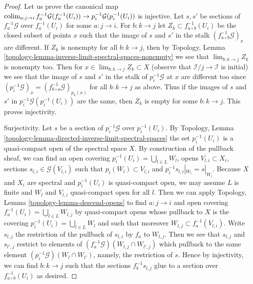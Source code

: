 \begin{proof}
Let us prove the canonical map
$\mathop{\mathrm{colim}}\nolimits_{a : j \to i} f_a^{-1}\mathcal{G}(f_a^{-1}(U_i)) \to
p_i^{-1}\mathcal{G}(p_i^{-1}(U_i))$ is injective.
Let $s, s'$ be sections of $f_a^{-1}\mathcal{G}$
over $f_a^{-1}(U_i)$ for some $a : j \to i$. For
$b : k \to j$ let $Z_k \subset f_{a \circ b}^{-1}(U_i)$
be the closed subset of points $x$ such that the image of
$s$ and $s'$ in the stalk $(f_{a \circ b}^{-1}\mathcal{G})_x$
are different. If $Z_k$ is nonempty for all $b : k \to j$, then by
Topology, Lemma \ref{topology-lemma-inverse-limit-spectral-spaces-nonempty}
we see that $\lim_{b : k \to j} Z_k$ is nonempty too.
Then for $x \in \lim_{b : k \to j} Z_k \subset X$
(observe that $\mathcal{I}/j \to \mathcal{I}$ is initial)
we see that the image of $s$ and $s'$ in the stalk of
$p_i^{-1}\mathcal{G}$ at $x$ are different too since
$(p_i^{-1}\mathcal{G})_x = (f_{b \circ a}^{-1}\mathcal{G})_{p_k(x)}$
for all $b : k \to j$ as above. Thus if the images of $s$ and $s'$
in $p_i^{-1}\mathcal{G}(p_i^{-1}(U_i))$ are the same, then $Z_k$
is empty for some $b : k \to j$. This proves injectivity.

\medskip\noindent
Surjectivity. Let $s$ be a section of $p_i^{-1}\mathcal{G}$ over
$p_i^{-1}(U_i)$. By
Topology, Lemma \ref{topology-lemma-directed-inverse-limit-spectral-spaces}
the set $p_i^{-1}(U_i)$ is a quasi-compact open of the spectral space $X$.
By construction of the pullback sheaf, we can find an open covering
$p_i^{-1}(U_i) = \bigcup_{l \in L} W_l$,
opens $V_{l, i} \subset X_i$,
sections $s_{l, i} \in \mathcal{G}(V_{l, i})$
such that $p_i(W_l) \subset V_{l, i}$ and $p_i^{-1}s_{l, i}|_{W_l} = s|_{W_l}$.
Because $X$ and $X_i$ are spectral and $p_i^{-1}(U_i)$ is quasi-compact open,
we may assume $L$ is finite and $W_l$ and $V_{l, i}$ quasi-compact open
for all $l$. Then we can apply
Topology, Lemma \ref{topology-lemma-descend-opens}
to find $a : j \to i$ and open covering
$f_a^{-1}(U_i) = \bigcup_{l \in L} W_{l, j}$ by quasi-compact
opens whose pullback to $X$ is the covering
$p_i^{-1}(U_i) = \bigcup_{l \in L} W_l$
and such that moreover $W_{l, j} \subset f_a^{-1}(V_{l, i})$.
Write $s_{l, j}$ the restriction of the pullback of $s_{l, i}$
by $f_a$ to $W_{l, j}$. Then we see that $s_{l, j}$ and $s_{l', j}$
restrict to elements of $(f_a^{-1}\mathcal{G})(W_{l, j} \cap W_{l', j})$
which pullback to the same element $(p_i^{-1}\mathcal{G})(W_l \cap W_{l'})$,
namely, the restriction of $s$. Hence by injectivity, we can find
$b : k \to j$ such that the sections $f_b^{-1}s_{l, j}$
glue to a section over $f_{a \circ b}^{-1}(U_i)$ as desired.
\end{proof}

